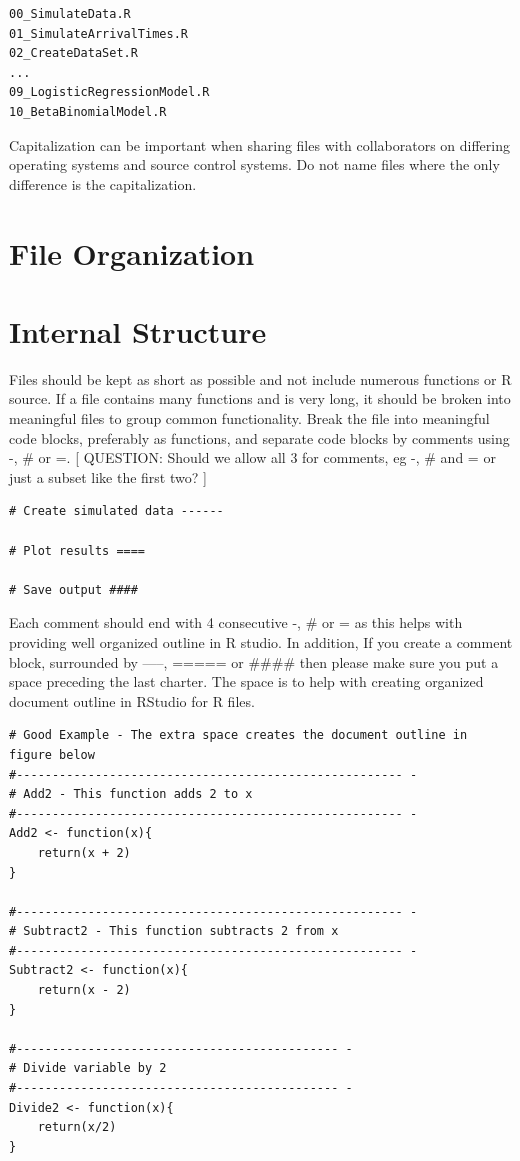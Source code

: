 \documentclass[
]{book}
\begin{document}
\begin{verbatim}
00_SimulateData.R
01_SimulateArrivalTimes.R
02_CreateDataSet.R
...
09_LogisticRegressionModel.R
10_BetaBinomialModel.R
\end{verbatim}

Capitalization can be important when sharing files with collaborators on differing operating systems and source control systems. Do not name files where the only difference is the capitalization.

\hypertarget{file-organization}{%
\section{File Organization}\label{file-organization}}

\hypertarget{internal-structure}{%
\section{Internal Structure}\label{internal-structure}}

Files should be kept as short as possible and not include numerous functions or R source. If a file contains many functions and is very long, it should be broken into meaningful files to group common functionality. Break the file into meaningful code blocks, preferably as functions, and separate code blocks by comments using -, \# or =. {[} QUESTION: Should we allow all 3 for comments, eg -, \# and = or just a subset like the first two? {]}

\begin{verbatim}
# Create simulated data ------ 

# Plot results ====

# Save output ####
\end{verbatim}

Each comment should end with 4 consecutive -, \# or = as this helps with providing well organized outline in R studio. In addition, If you create a comment block, surrounded by -----, ===== or \#\#\#\# then please make sure you put a space preceding the last charter. The space is to help with creating organized document outline in RStudio for R files.

\begin{verbatim}
# Good Example - The extra space creates the document outline in figure below
#------------------------------------------------------ -
# Add2 - This function adds 2 to x
#------------------------------------------------------ -
Add2 <- function(x){
    return(x + 2)
}
    
#------------------------------------------------------ -
# Subtract2 - This function subtracts 2 from x
#------------------------------------------------------ -
Subtract2 <- function(x){
    return(x - 2)
}

#--------------------------------------------- - 
# Divide variable by 2
#--------------------------------------------- - 
Divide2 <- function(x){
    return(x/2)
}
\end{verbatim}
\end{document}
